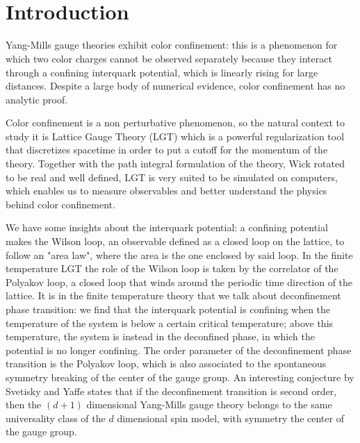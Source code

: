 \documentclass[reqno,12pt]{article}
\numberwithin{equation}{section}
\begin{document}
\newpage

\thispagestyle{empty}
\

\newpage

\tableofcontents

\newpage
\thispagestyle{empty}
\

\newpage


\section{Introduction}

Yang-Mills gauge theories exhibit color confinement: this is a phenomenon for which two color charges cannot be
observed separately because they interact through a confining interquark potential, which is linearly rising for
large distances. Despite a large body of numerical evidence, color confinement has no analytic proof.

Color confinement is a non perturbative phenomenon, so the natural context to study it is Lattice Gauge Theory (LGT) which is
a powerful regularization tool that discretizes spacetime in order to put a cutoff for the momentum of the theory. Together with
the path integral formulation of the theory, Wick rotated to be real and well defined, LGT is very suited to be simulated
on computers, which enables us to measure observables and better understand the physics behind color confinement. 

We have some insights about the interquark potential: a confining potential makes the Wilson loop, an observable defined
as a closed loop on the lattice, to follow an "area law", where the area is the one enclosed by said loop. In the
finite temperature LGT the role of the Wilson loop is taken by the correlator of the Polyakov loop, a closed loop that winds
around the periodic time direction of the lattice. It is in the finite temperature theory that we talk about deconfinement
phase transition: we find that the interquark potential is confining when the temperature of the system is below a certain
critical temperature; above this temperature, the system is instead in the deconfined phase, in which the potential is 
no longer confining. The order parameter of the deconfinement phase transition is the Polyakov loop, which is also 
associated to the spontaneous symmetry breaking of the center of the gauge group. An interesting conjecture by
Svetisky and Yaffe states that if the deconfinement transition is second order, then the $(d+1)$ dimensional
Yang-Mills gauge theory belongs to the same universality class of the $d$ dimensional spin model, with symmetry
the center of the gauge group. 
\end{document}
